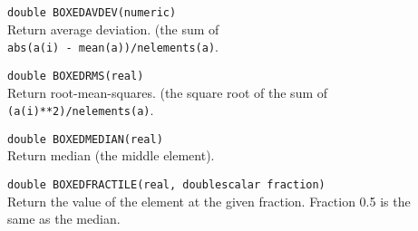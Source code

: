 \begin{description}
  \item[] \texttt{double BOXEDAVDEV(numeric)}\\
    Return average deviation. (the sum of 
    \\\texttt{abs(a(i) - mean(a))/nelements(a)}.
  \item[] \texttt{double BOXEDRMS(real)}\\
    Return root-mean-squares. (the square root of the sum of
    \\\texttt{(a(i)**2)/nelements(a)}.
  \item[] \texttt{double BOXEDMEDIAN(real)}\\
    Return median (the middle element).
  \item[] \texttt{double BOXEDFRACTILE(real, doublescalar fraction)}\\
    Return the value of the element at the given fraction.
    Fraction 0.5 is the same as the median.
\end{description}

